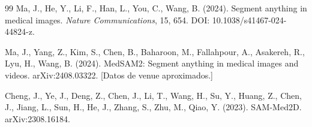 \begin{thebibliography}{99}
Ma, J., He, Y., Li, F., Han, L., You, C., Wang, B. (2024). Segment anything in medical images. \emph{Nature Communications}, 15, 654. DOI: 10.1038/s41467-024-44824-z.

Ma, J., Yang, Z., Kim, S., Chen, B., Baharoon, M., Fallahpour, A., Asakereh, R., Lyu, H., Wang, B. (2024). MedSAM2: Segment anything in medical images and videos. arXiv:2408.03322. [Datos de venue aproximados.]

Cheng, J., Ye, J., Deng, Z., Chen, J., Li, T., Wang, H., Su, Y., Huang, Z., Chen, J., Jiang, L., Sun, H., He, J., Zhang, S., Zhu, M., Qiao, Y. (2023). SAM-Med2D. arXiv:2308.16184.

\end{thebibliography}
